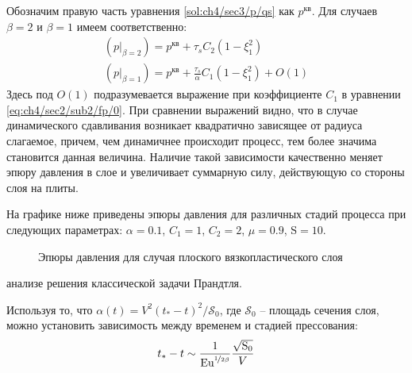Обозначим правую часть уравнения \cref{sol:ch4/sec3/p/qs} как $p^\text{кв}$. Для случаев $\beta=2$ и $\beta=1$ имеем соответственно:
\begin{gather}
  \left(p\lvert_{\beta=2}\right) = p^\text{кв} + \tau_{s} C_2 \left(1-\xi_1^2\right)
  \\
  \left(p\lvert_{\beta=1}\right) = p^\text{кв} + \frac{\tau_{s}}{\alpha} C_1 \left(1-\xi_1^2\right) + O(1)
\end{gather}
Здесь под $O(1)$ подразумевается выражение при коэффициенте $C_1$ в уравнении \cref{eq:ch4/sec2/sub2/fp/0}.
При сравнении выражений видно, что в случае динамического сдавливания возникает квадратично зависящее от радиуса слагаемое, причем, чем динамичнее происходит процесс, тем более значима становится данная величина. Наличие такой зависимости качественно меняет эпюру давления в слое и увеличивает суммарную силу, действующую со стороны слоя на плиты.

На графике ниже приведены эпюры давления для различных стадий процесса при следующих параметрах: $\alpha=0.1$, $C_1=1$, $C_2=2$, $\mu=0.9$, $\text{S}=10$.
\begin{figure}[ht]
    \caption{Эпюры давления для случая плоского вязкопластического слоя}
    \label{fig:ch4/pressure}
\end{figure}анализе решения классической задачи Прандтля.

Используя то, что $\alpha(t) = V^2\left(t_*-t\right)^2 / \mathcal{\text{S}}_0$, где $\mathcal{\text{S}}_0$ -- площадь сечения слоя, можно установить зависимость между временем и стадией прессования:
\begin{equation}
  t_* - t \sim \frac{1}{\text{Eu}^{\nicefrac{1}{2\beta}}}\frac{\sqrt{\mathcal{\text{S}}_0}}{V}
\end{equation}
